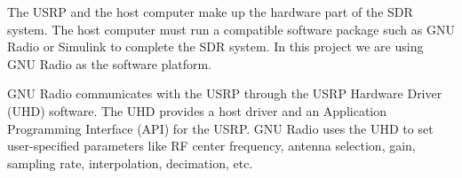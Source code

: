 The USRP and the host computer make up the hardware part of the SDR system. The host computer must run a compatible software package such as GNU Radio or Simulink to complete the SDR system. In this project we are using GNU Radio as the software platform.

GNU Radio communicates with the USRP through the USRP Hardware Driver (UHD) software. The UHD provides a host driver and an Application Programming Interface (API) for the USRP. GNU Radio uses the UHD to set user-specified parameters like RF center frequency, antenna selection, gain, sampling rate, interpolation, decimation, etc.
